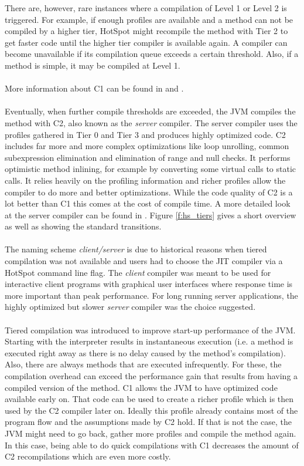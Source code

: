 There are, however, rare instances where a compilation of Level 1 or Level 2 is triggered. For example, if enough profiles are available and a method can not be compiled by a higher tier, HotSpot might recompile the method with Tier 2 to get faster code until the higher tier compiler is available again. A compiler can become unavailable if its compilation queue exceeds a certain threshold. Also, if a method is simple, it may be compiled at Level 1.
\\\\
More information about C1 can be found in \cite{client_compiler_talk} and \cite{client_compiler}.
\\\\
Eventually, when further compile thresholds are exceeded, the JVM compiles the method with C2, also known as the \textit{server} compiler.
The server compiler uses the profiles gathered in Tier 0 and Tier 3 and produces highly optimized code. C2 includes far more and more complex optimizations like loop unrolling, common subexpression elimination and elimination of range and null checks. It performs optimistic method inlining, for example by converting some virtual calls to static calls. It relies heavily on the profiling information and richer profiles allow the compiler to do more and better optimizations.
While the code quality of C2 is a lot better than C1 this comes at the cost of compile time. A more detailed look at the server compiler can be found in \cite{server_compiler}.
Figure \ref{f:hs_tiers} gives a short overview as well as showing the standard transitions.
\\\\
The naming scheme \textit{client/server} is due to historical reasons when tiered compilation was not available and users had to choose the JIT compiler via a HotSpot command line flag. The \textit{client} compiler was meant to be used for interactive client programs with graphical user interfaces where response time is more important than peak performance. For long running server applications, the highly optimized but slower \textit{server} compiler was the choice suggested. 
\\\\
Tiered compilation was introduced to improve start-up performance of the JVM.
Starting with the interpreter results in instantaneous execution (i.e. a method is executed right away as there is no delay caused by the method's compilation). Also, there are always methods that are executed infrequently. For these, the compilation overhead can exceed the performance gain that results from having a compiled version of the method. C1 allows the JVM to have optimized code available early on. That code can be used to create a richer profile which is then used by the C2 compiler later on. Ideally this profile already contains most of the program flow and the assumptions made by C2 hold. If that is not the case, the JVM might need to go back, gather more profiles and compile the method again. In this case, being able to do quick compilations with C1 decreases the amount of C2 recompilations which are even more costly.

